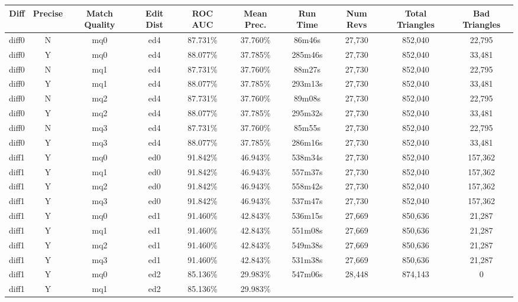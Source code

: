 \begin{sidewaystable}[!tp]
  \begin{center}
    \begin{tabular}{|c|c|c|c||c|c||c|c|c|c|}
\hline
Diff & Precise & Match Quality & Edit Dist
	& ROC AUC & Mean Prec.
	& Run Time & Num Revs
	& Total Triangles & Bad Triangles \\
\hline
\hline
diff0 & N & mq0 & ed4
	& 87.731\% & 37.760\%
	& 86m46s & 27,730
	& 852,040 & 22,795 \\
diff0 & Y & mq0 & ed4
	& 88.077\% & 37.785\%
	& 285m46s & 27,730
	& 852,040 & 33,481 \\
diff0 & N & mq1 & ed4
	& 87.731\% & 37.760\%
	& 88m27s & 27,730
	& 852,040 & 22,795 \\
diff0 & Y & mq1 & ed4
	& 88.077\% & 37.785\%
	& 293m13s & 27,730
	& 852,040 & 33,481 \\
diff0 & N & mq2 & ed4
	& 87.731\% & 37.760\%
	& 89m08s & 27,730
	& 852,040 & 22,795 \\
diff0 & Y & mq2 & ed4
	& 88.077\% & 37.785\%
	& 295m32s & 27,730
	& 852,040 & 33,481 \\
diff0 & N & mq3 & ed4
	& 87.731\% & 37.760\%
	& 85m55s & 27,730
	& 852,040 & 22,795 \\
diff0 & Y & mq3 & ed4
	& 88.077\% & 37.785\%
	& 286m16s & 27,730
	& 852,040 & 33,481 \\
diff1 & Y & mq0 & ed0
	& 91.842\% & 46.943\%
	& 538m34s & 27,730
	& 852,040 & 157,362 \\
diff1 & Y & mq1 & ed0
	& 91.842\% & 46.943\%
	& 557m37s & 27,730
	& 852,040 & 157,362 \\
diff1 & Y & mq2 & ed0
	& 91.842\% & 46.943\%
	& 558m42s & 27,730
	& 852,040 & 157,362 \\
diff1 & Y & mq3 & ed0
	& 91.842\% & 46.943\%
	& 537m47s & 27,730
	& 852,040 & 157,362 \\
diff1 & Y & mq0 & ed1
	& 91.460\% & 42.843\%
	& 536m15s & 27,669
	& 850,636 & 21,287 \\
diff1 & Y & mq1 & ed1
	& 91.460\% & 42.843\%
	& 551m08s & 27,669
	& 850,636 & 21,287 \\
diff1 & Y & mq2 & ed1
	& 91.460\% & 42.843\%
	& 549m38s & 27,669
	& 850,636 & 21,287 \\
diff1 & Y & mq3 & ed1
	& 91.460\% & 42.843\%
	& 531m38s & 27,669
	& 850,636 & 21,287 \\
diff1 & Y & mq0 & ed2
	& 85.136\% & 29.983\%
	& 547m06s & 28,448
	& 874,143 & 0 \\
diff1 & Y & mq1 & ed2
	& 85.136\% & 29.983\%

\end{tabular}
\end{center}
\end{sidewaystable}
